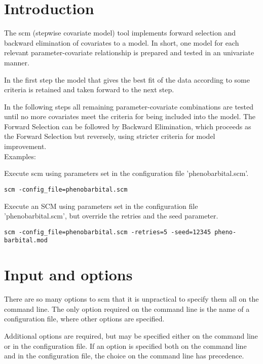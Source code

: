 



\maketitle
\newcommand{\guidetoolname}{scm}


\section{Introduction}

The scm (stepwise covariate model) tool implements forward selection and backward elimination of covariates to a model. In short, one model for each relevant parameter-covariate relationship is prepared and tested in an univariate manner. 

In the first step the model that gives the best fit of the data according to some criteria is retained and taken forward to the next step. 

In the following steps all remaining parameter-covariate combinations are tested until no more covariates meet the criteria for being included into the model. The Forward Selection can be followed by Backward Elimination, which proceeds as the Forward Selection but reversely, using stricter criteria for model improvement. \\
Examples:

Execute scm using parameters set in the configuration file 'phenobarbital.scm'.
\begin{verbatim}
scm -config_file=phenobarbital.scm
\end{verbatim}

Execute an SCM using parameters set in the configuration file 'phenobarbital.scm', but override the retries and the seed
parameter. 
\begin{verbatim}
scm -config_file=phenobarbital.scm -retries=5 -seed=12345 pheno-
barbital.mod
\end{verbatim}

\section{Input and options}
There are so many options to scm that it is unpractical to specify them all on the command line. The only option required on the command line is the name of a configuration file, where other options are specified. 

Additional options are required, but may be specified either on the command line or in the configuration file. If an option is specified both on the command line and in the configuration file, the choice on the command line has precedence. 

